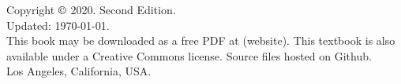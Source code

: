 	\null \vfill
	\noindent%
		Copyright $\copyright$ 2020. Second Edition. \\
		Updated: \today. \\
	\noindent%
		This book may be downloaded as a free PDF at (website).
		This textbook is also available under a Creative Commons license.
		Source files hosted on {Github}. \\

	\noindent Los Angeles, California, USA.
	\clearpage
